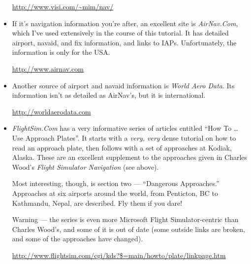 \begin{itemize}

  \url{http://www.visi.com/~mim/nav/}

\item If it's navigation information you're after, an excellent site
  is \textit{AirNav.Com}, which I've used extensively in the course of
  this tutorial.  It has detailed airport, navaid, and fix
  information, and links to IAPs.  Unfortunately, the information is
  only for the USA.

  \url{http://www.airnav.com}

\item Another source of airport and navaid information is
  \textit{World Aero Data}.  Its information isn't as detailed as
  AirNav's, but it is international.

  \url{http://worldaerodata.com}

\item \textit{FlightSim.Com} has a very informative series of articles
  entitled ``How To \ldots{} Use Approach Plates''.  It starts with a
  \emph{very, very} dense tutorial on how to read an approach plate,
  then follows with a set of approaches at Kodiak, Alaska.  These are
  an excellent supplement to the approaches given in Charles Wood's
  \textit{Flight Simulator Navigation} (see above).

  Most interesting, though, is section two --- ``Dangerous
  Approaches.''  Approaches at six airports around the world, from
  Penticton, BC to Kathmandu, Nepal, are described.  Fly them if you
  dare!

  Warning --- the series is even more Microsoft Flight
  Simulator-centric than Charles Wood's, and some of it is out of date
  (some outside links are broken, and some of the approaches have
  changed).

  \url{http://www.flightsim.com/cgi/kds?$=main/howto/plate/linkpage.htm}

%
%

%
%

%
%

%
%


\end{itemize}
